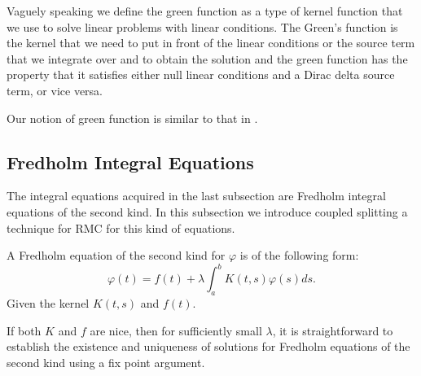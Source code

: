 \documentclass[a4paper,12pt]{article}
\begin{document}
\begin{definition}
    Vaguely speaking we define the green function as a type of kernel function that we use
    to solve linear problems with linear conditions. The Green's function is the kernel that
    we need to put in front of  the linear conditions or the source term that we integrate
    over and to obtain the solution  and the green function has the property that it satisfies
    either null linear conditions and a Dirac delta source term, or vice versa.
\end{definition}

\begin{related}
    Our notion of green function is similar to that in \cite{hwang_simulationtabulation_2001}.
\end{related}


\subsection{Fredholm Integral Equations}

The integral equations acquired in the last subsection are Fredholm integral equations
of the second kind. In this subsection we introduce coupled splitting a technique for
RMC for this kind of equations.


\begin{definition}
    A Fredholm equation of the second kind for $\varphi$  is of the following form:
    \begin{equation}
        \varphi(t)=f(t)+\lambda \int_a^b K(t, s) \varphi(s) ds.
    \end{equation}
    Given the kernel  $K(t, s)$  and  $ f(t)$.
\end{definition}

If both $K$ and $f$ are nice, then for sufficiently small $\lambda$,
it is straightforward to establish the existence and uniqueness of solutions
for Fredholm equations of the second kind using a fix point argument.

\end{document}
